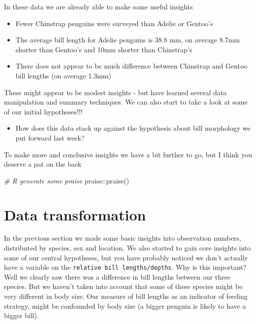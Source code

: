 \documentclass[
]{book}
\makeatletter
\newenvironment{Shaded}{\begin{snugshade}}{\end{snugshade}}
\newcommand{\CommentTok}[1]{\textcolor[rgb]{0.56,0.35,0.01}{\textit{#1}}}
\newcommand{\FunctionTok}[1]{\textcolor[rgb]{0.00,0.00,0.00}{#1}}
\newcommand{\NormalTok}[1]{#1}
\newcommand{\SpecialCharTok}[1]{\textcolor[rgb]{0.00,0.00,0.00}{#1}}
\providecommand{\tightlist}{%
  \setlength{\itemsep}{0pt}\setlength{\parskip}{0pt}}
\newenvironment{kframe}{%
\medskip{}
\setlength{\fboxsep}{.8em}
 \def\at@end@of@kframe{}%
 \ifinner\ifhmode%
  \def\at@end@of@kframe{\end{minipage}}%
  \begin{minipage}{\columnwidth}%
 \fi\fi%
 \def\FrameCommand##1{\hskip\@totalleftmargin \hskip-\fboxsep
 \colorbox{shadecolor}{##1}\hskip-\fboxsep
     \hskip-\linewidth \hskip-\@totalleftmargin \hskip\columnwidth}%
 \MakeFramed {\advance\hsize-\width
   \@totalleftmargin\z@ \linewidth\hsize
   \@setminipage}}%
 {\par\unskip\endMakeFramed%
 \at@end@of@kframe}
\newenvironment{block}[1]
  {
  \begin{itemize}
  \renewcommand{\labelitemi}{
    \raisebox{-.7\height}[0pt][0pt]{
      {\setkeys{Gin}{width=3em,keepaspectratio}\texttt{[image: images/\#1]}}
    }
  }
  \setlength{\fboxsep}{1em}
  \begin{kframe}
  \item
  }
  {
  \end{kframe}
  \end{itemize}
  }
\newenvironment{rmdquestion}
  {\begin{block}{question}}
  {\end{block}}
\makeatother
\begin{document}
In these data we are already able to make some useful insights

\begin{itemize}
\item
  Fewer Chinstrap penguins were surveyed than Adelie or Gentoo's
\item
  The average bill length for Adelie penguins is 38.8 mm, on average 8.7mm shorter than Gentoo's and 10mm shorter than Chinstrap's
\item
  There does not appear to be much difference between Chinstrap and Gentoo bill lengths (on average 1.3mm)
\end{itemize}

These might appear to be modest insights - but have learned several data manipulation and summary techniques. We can also start to take a look at some of our initial hypotheses!!!

\begin{rmdquestion}
\begin{itemize}
\tightlist
\item
  How does this data stack up against the hypothesis about bill
  morphology we put forward last week?
\end{itemize}
\end{rmdquestion}

To make more and conclusive insights we have a bit further to go, but I think you deserve a pat on the back

\begin{Shaded}
\begin{Highlighting}[]
\CommentTok{\# R generate some praise}
\NormalTok{praise}\SpecialCharTok{::}\FunctionTok{praise}\NormalTok{()}
\end{Highlighting}
\end{Shaded}

\hypertarget{data-transformation}{%
\section{Data transformation}\label{data-transformation}}

In the previous section we made some basic insights into observation numbers, distributed by species, sex and location. We also started to gain core insights into some of our central hypotheses, but you have probably noticed we don't actually have a variable on the \texttt{relative\ bill\ lengths/depths}. Why is this important? Well we clearly saw there was a difference in bill lengths between our three species. But we haven't taken into account that some of these species might be very different in body size. Our measure of bill lengths as an indicator of feeding strategy, might be confounded by body size (a bigger penguin is likely to have a bigger bill).
\end{document}
